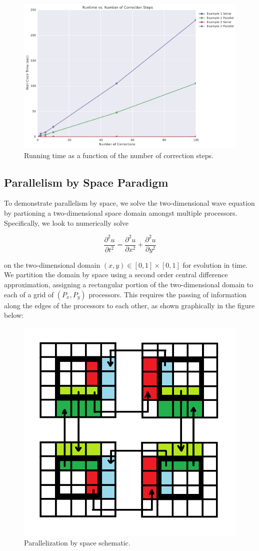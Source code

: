 \documentclass[letterpaper,12pt]{article}
\begin{document}
\begin{figure}
\begin{center}
\includegraphics[width=0.75\linewidth]{data/runtime_vs_corrections.pdf}
\caption{Running time as a function of the number of correction steps.}
\label{fig:run_v_k}
\end{center}
\end{figure}

\subsection{Parallelism by Space Paradigm}

To demonstrate parallelism by space, we solve the two-dimensional wave equation by partioning a two-dimensional space domain amongst multiple processors. Specifically, we look to numerically solve

\begin{equation*}
\frac{\partial^2 u}{\partial t^2} = \frac{\partial^2 u}{\partial x^2} + \frac{\partial^2 u}{\partial y^2}
\end{equation*}

on the two-dimensional domain $(x, y) \in [0,1]\times[0,1]$ for evolution in time. We partition the domain by space using a second order central difference approximation, assigning a rectangular portion of the two-dimensional domain to each of a grid of $(P_x, P_y)$ processors. This requires the passing of information along the edges of the processors to each other, as shown graphically in the figure below:

\begin{figure}[H]
\begin{center}
\includegraphics[width=0.5\linewidth]{decomp.png}
\caption{Parallelization by space schematic.}
\label{fig:spaceparallel}
\end{center}
\end{figure}
\end{document}
